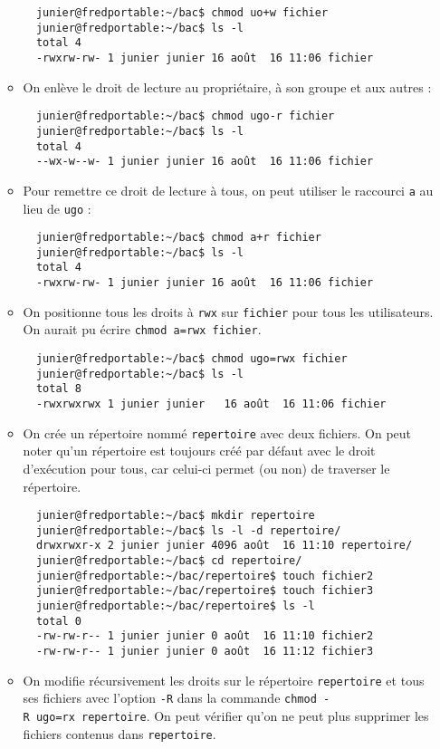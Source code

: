 \documentclass[
  11pt,
]{article}
\newcounter{prop}
\begin{document}
\begin{itemize}
\begin{itemize}
\begin{verbatim}
  junier@fredportable:~/bac$ chmod uo+w fichier
  junier@fredportable:~/bac$ ls -l
  total 4
  -rwxrw-rw- 1 junier junier 16 août  16 11:06 fichier
\end{verbatim}
  \item
    On enlève le droit de lecture au propriétaire, à son groupe et aux
    autres :

\begin{verbatim}
  junier@fredportable:~/bac$ chmod ugo-r fichier
  junier@fredportable:~/bac$ ls -l
  total 4
  --wx-w--w- 1 junier junier 16 août  16 11:06 fichier
\end{verbatim}
  \item
    Pour remettre ce droit de lecture à tous, on peut utiliser le
    raccourci \texttt{a} au lieu de \texttt{ugo} :

\begin{verbatim}
  junier@fredportable:~/bac$ chmod a+r fichier 
  junier@fredportable:~/bac$ ls -l
  total 4
  -rwxrw-rw- 1 junier junier 16 août  16 11:06 fichier
\end{verbatim}
  \item
    On positionne tous les droits à \texttt{rwx} sur \texttt{fichier}
    pour tous les utilisateurs. On aurait pu écrire
    \texttt{chmod\ a=rwx\ fichier}.

\begin{verbatim}
  junier@fredportable:~/bac$ chmod ugo=rwx fichier 
  junier@fredportable:~/bac$ ls -l
  total 8
  -rwxrwxrwx 1 junier junier   16 août  16 11:06 fichier
\end{verbatim}
  \item
    On crée un répertoire nommé \texttt{repertoire} avec deux fichiers.
    On peut noter qu'un répertoire est toujours créé par défaut avec le
    droit d'exécution pour tous, car celui-ci permet (ou non) de
    traverser le répertoire.

\begin{verbatim}
  junier@fredportable:~/bac$ mkdir repertoire
  junier@fredportable:~/bac$ ls -l -d repertoire/
  drwxrwxr-x 2 junier junier 4096 août  16 11:10 repertoire/
  junier@fredportable:~/bac$ cd repertoire/
  junier@fredportable:~/bac/repertoire$ touch fichier2
  junier@fredportable:~/bac/repertoire$ touch fichier3
  junier@fredportable:~/bac/repertoire$ ls -l
  total 0
  -rw-rw-r-- 1 junier junier 0 août  16 11:10 fichier2
  -rw-rw-r-- 1 junier junier 0 août  16 11:12 fichier3
\end{verbatim}
  \item
    On modifie récursivement les droits sur le répertoire
    \texttt{repertoire} et tous ses fichiers avec l'option \texttt{-R}
    dans la commande \texttt{chmod\ -R\ ugo=rx\ repertoire}. On peut
    vérifier qu'on ne peut plus supprimer les fichiers contenus dans
    \texttt{repertoire}.


\end{itemize}
\end{itemize}
\end{document}
